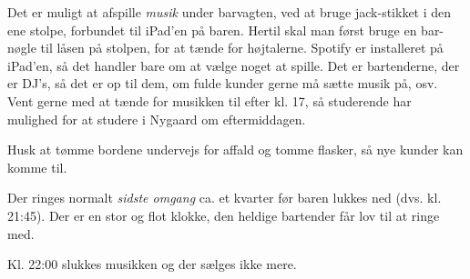 Det er muligt at afspille \textit{musik} under barvagten, ved at bruge
jack-stikket i den ene stolpe, forbundet til iPad'en på baren. 
Hertil skal man først bruge en bar-nøgle
til låsen på stolpen, for at tænde for højtalerne. 
Spotify er installeret på iPad'en, så det handler bare om at vælge noget at spille.
Det er bartenderne, der er DJ's, så det er op til dem, 
om fulde kunder gerne må sætte musik på, osv.
Vent gerne med at tænde for musikken til efter kl. 17, så studerende har mulighed
for at studere i Nygaard om eftermiddagen. 

Husk at tømme bordene undervejs for affald og tomme flasker, så nye 
kunder kan komme til.

Der ringes normalt \textit{sidste omgang} 
ca. et kvarter før baren lukkes ned
(dvs. kl. 21:45). Der er en stor og flot klokke, den heldige bartender
får lov til at ringe med.

Kl. 22:00 slukkes musikken og der sælges ikke mere.